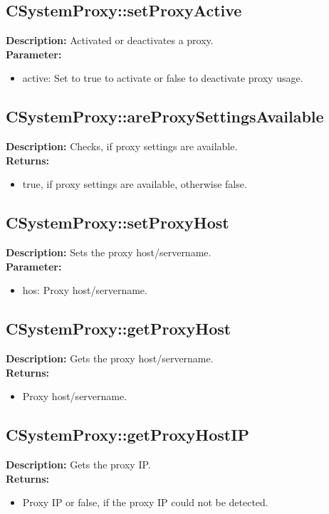 \subsection{CSystemProxy::setProxyActive}
\textbf{Description:} Activated or deactivates a proxy.\\
\textbf{Parameter:}
\begin{itemize}
\item active: Set to true to activate or false to deactivate proxy usage.
\end{itemize}

\subsection{CSystemProxy::areProxySettingsAvailable}
\textbf{Description:} Checks, if proxy settings are available.\\
\textbf{Returns:}
\begin{itemize}
\item true, if proxy settings are available, otherwise false.
\end{itemize}

\subsection{CSystemProxy::setProxyHost}
\textbf{Description:} Sets the proxy host/servername.\\
\textbf{Parameter:}
\begin{itemize}
\item hos: Proxy host/servername.
\end{itemize}

\subsection{CSystemProxy::getProxyHost}
\textbf{Description:} Gets the proxy host/servername.\\
\textbf{Returns:}
\begin{itemize}
\item Proxy host/servername.
\end{itemize}

\subsection{CSystemProxy::getProxyHostIP}
\textbf{Description:} Gets the proxy IP.\\
\textbf{Returns:}
\begin{itemize}
\item Proxy IP or false, if the proxy IP could not be detected.
\end{itemize}

